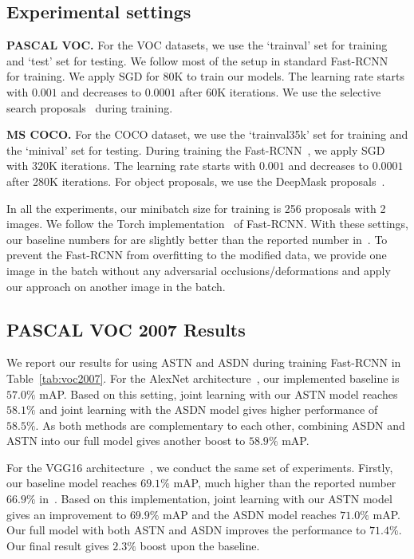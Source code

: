 \subsection{Experimental settings}

\textbf{PASCAL VOC.} For the VOC datasets, we use the `trainval' set for training and `test' set for testing.  We follow most of the setup in standard Fast-RCNN~\cite{frcn} for training. We apply SGD for 80K to train our models. The learning rate starts with $0.001$ and decreases to $0.0001$ after 60K iterations. We use the selective search proposals~\cite{Uijlings13} during training. 

\textbf{MS COCO.} For the COCO dataset, we use the `trainval35k' set for training and the  `minival' set for testing. During training the Fast-RCNN~\cite{frcn}, we apply SGD with 320K iterations. The learning rate starts with $0.001$ and decreases to $0.0001$ after 280K iterations. For object proposals, we use the DeepMask proposals~\cite{DeepMask}. 

In all the experiments, our minibatch size for training is 256 proposals with 2 images. We follow the Torch implementation~\cite{Zagoruyko2016Multipath} of Fast-RCNN. With these settings, our baseline numbers for are slightly better than the reported number in~\cite{frcn}. To prevent the Fast-RCNN from overfitting to the modified data, we provide one image in the batch without any adversarial occlusions/deformations and apply our approach on another image in the batch. 


\subsection{PASCAL VOC 2007 Results}
\vspace{-0.05in}
We report our results for using ASTN and ASDN during training Fast-RCNN in Table~\ref{tab:voc2007}. For the AlexNet architecture~\cite{alex}, our implemented baseline is $57.0\%$ mAP. Based on this setting, joint learning with our ASTN model reaches $58.1\%$ and joint learning with the ASDN model gives higher performance of $58.5\%$. As both methods are complementary to each other, combining ASDN and ASTN into our full model gives another boost to $58.9\%$ mAP. 

For the VGG16 architecture~\cite{VGG}, we conduct the same set of experiments. Firstly, our baseline model reaches $69.1\%$ mAP, much higher than the reported number $66.9\%$ in~\cite{frcn}. Based on this implementation, joint learning with our ASTN model gives an improvement to $69.9\%$ mAP and the ASDN model reaches $71.0\%$ mAP. Our full model with both ASTN and ASDN improves the performance to $71.4\%$. Our final result gives  $2.3\%$ boost upon the baseline. 

